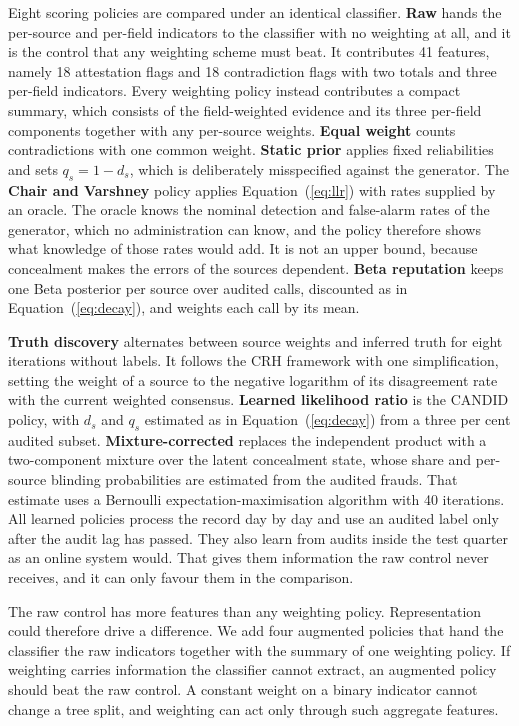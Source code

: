 \documentclass[information,article,submit,moreauthors]{Definitions/mdpi}
\begin{document}
Eight scoring policies are compared under an identical classifier. \textbf{Raw} hands the per-source and per-field indicators to the classifier with no weighting at all, and it is the control that any weighting scheme must beat. It contributes 41 features, namely 18 attestation flags and 18 contradiction flags with two totals and three per-field indicators. Every weighting policy instead contributes a compact summary, which consists of the field-weighted evidence and its three per-field components together with any per-source weights. \textbf{Equal weight} counts contradictions with one common weight. \textbf{Static prior} applies fixed reliabilities and sets $q_s = 1 - d_s$, which is deliberately misspecified against the generator. The \textbf{Chair and Varshney} policy applies Equation~(\ref{eq:llr}) with rates supplied by an oracle. The oracle knows the nominal detection and false-alarm rates of the generator, which no administration can know, and the policy therefore shows what knowledge of those rates would add. It is not an upper bound, because concealment makes the errors of the sources dependent. \textbf{Beta reputation} keeps one Beta posterior per source over audited calls, discounted as in Equation~(\ref{eq:decay}), and weights each call by its mean.

\textbf{Truth discovery} alternates between source weights and inferred truth for eight iterations without labels. It follows the CRH framework \cite{li2014resolving} with one simplification, setting the weight of a source to the negative logarithm of its disagreement rate with the current weighted consensus. \textbf{Learned likelihood ratio} is the CANDID policy, with $d_s$ and $q_s$ estimated as in Equation~(\ref{eq:decay}) from a three per cent audited subset. \textbf{Mixture-corrected} replaces the independent product with a two-component mixture over the latent concealment state, whose share and per-source blinding probabilities are estimated from the audited frauds. That estimate uses a Bernoulli expectation-maximisation algorithm with 40 iterations. All learned policies process the record day by day and use an audited label only after the audit lag has passed. They also learn from audits inside the test quarter as an online system would. That gives them information the raw control never receives, and it can only favour them in the comparison.

The raw control has more features than any weighting policy. Representation could therefore drive a difference. We add four augmented policies that hand the classifier the raw indicators together with the summary of one weighting policy. If weighting carries information the classifier cannot extract, an augmented policy should beat the raw control. A constant weight on a binary indicator cannot change a tree split, and weighting can act only through such aggregate features.
\end{document}
